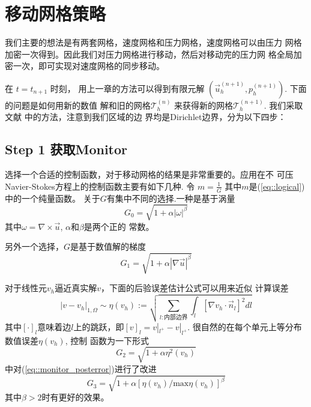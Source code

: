 \section{移动网格策略}

   我们主要的想法是有两套网格，速度网格和压力网格，速度网格可以由压力
   网格加密一次得到。因此我们对压力网格进行移动，然后对移动完的压力网
   格全局加密一次，即可实现对速度网格的同步移动。

   在 $t = t_{n + 1}$ 时刻， 用上一章的方法可以得到有限元解
   $(\vec{u}_h^{(n + 1)}, p_h^{(n + 1)})$. 下面的问题是如何用新的数值
   解和旧的网格$\mathcal {T}_h^{(n)}$ 来获得新的网格$\mathcal {T}_h^{(n +
   1)}$. 我们采取文献 \cite{di2005moving} 中的方法，注意到我们区域的边
   界均是Dirichlet边界，分为以下四步：
   \subsection{Step 1 获取Monitor}
     选择一个合适的控制函数，对于移动网格的结果是非常重要的。应用在不
     可压Navier-Stokes方程上的控制函数主要有如下几种.
     令 $m = \frac{1}{G}$ 其中$m$是(\ref{eq::logical})中的一个纯量函数。
     关于$G$有集中不同的选择.一种是基于涡量
     \begin{equation}
       G_0 = \sqrt{1 + \alpha |\omega|^\beta}
       \label{eq::monitor_vorticity}
     \end{equation}
     其中$\omega = \nabla \times \vec{u}$, $\alpha$和$\beta$是两个正的
     常数。

      另外一个选择，$G$是基于数值解的梯度
      \begin{equation}
        G_1 = \sqrt{1 + \alpha |\nabla \vec{u}|^\beta}
        \label{eq::monitor_gradient}
      \end{equation}

      对于线性元$v_h$逼近真实解$v$，下面的后验误差估计公式可以用来近似
      计算误差
      \begin{equation}
        |v - v_h|_{1, \Omega} \sim \eta(v_h) := \sqrt{\sum\limits_{l:
            \text{内部边界}} \int_l \left[ \nabla v_h \cdot \vec{n}_l
            \right]^2 dl}
      \end{equation}
      其中$[\cdot]_l$意味着边$l$上的跳跃，即$[v]_l = v|_{l^{+}} -
      v|_{l^{+}}$. 很自然的在每个单元上等分布数值误差$\eta(v_h)$, 控制
      函数为一下形式
      \begin{equation}
        G_2 = \sqrt{1 + \alpha \eta^2(v_h)}
        \label{eq::monitor_posterror}
      \end{equation}
      \cite{di2005moving}中对(\ref{eq::monitor_posterror})进行了改进
      \begin{equation}
        G_3 = \sqrt{1 + \alpha \left[ \eta(v_h) / \text{max}\eta(v_h)
          \right]^\beta}
        \label{eq::monitor_posterror_modified}
      \end{equation}
      其中$\beta > 2$时有更好的效果。

